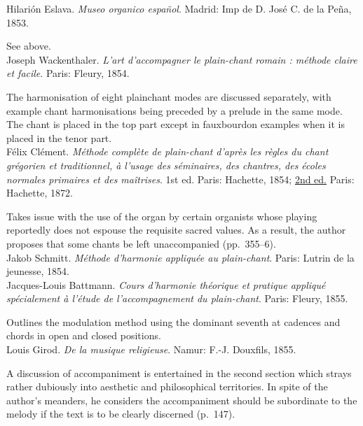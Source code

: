     \parindent=0pt
    \hangindent=0pt
  Hilarión Eslava. \emph{Museo organico español}. Madrid:  Imp de D. José C. de la Peña, 1853.

     \parindent=20pt
     \hangindent=20pt
     See  above.\\

    \parindent=0pt
    \hangindent=0pt
  Joseph Wackenthaler. \emph{L'art d'accompagner le plain-chant romain : méthode claire et facile}. Paris:  Fleury, 1854.

     \parindent=20pt
     \hangindent=20pt
     The harmonisation of eight plainchant modes are discussed separately, with example chant harmonisations being preceded by a prelude in the same mode. The chant is placed in the top part except in fauxbourdon examples when it is placed in the tenor part.\\

    \parindent=0pt
    \hangindent=0pt
  Félix Clément. \emph{Méthode complète de plain-chant d'après les règles du chant grégorien et traditionnel, à l'usage des séminaires, des chantres, des écoles normales primaires et des maîtrises}. 1st ed. Paris:  Hachette, 1854;  \underline{2nd ed.} Paris:  Hachette, 1872.

     \parindent=20pt
     \hangindent=20pt
     Takes issue with the use of the organ by certain organists whose playing reportedly does not espouse the requisite sacred values. As a result, the author proposes that some chants be left unaccompanied (pp.~355--6).\\

    \parindent=0pt
    \hangindent=0pt
  \covid{}Jakob Schmitt. \emph{Méthode d'harmonie appliquée au plain-chant}. Paris:  Lutrin de la jeunesse, 1854. \\

    \parindent=0pt
    \hangindent=0pt
  Jacques-Louis Battmann. \emph{Cours d'harmonie théorique et pratique appliqué spécialement à l'étude de l'accompagnement du plain-chant}. Paris:  Fleury, 1855.

     \parindent=20pt
     \hangindent=20pt
     Outlines the modulation method using the dominant seventh at cadences and chords in open and closed positions.\\

    \parindent=0pt
    \hangindent=0pt
  Louis Girod. \emph{De la musique religieuse}. Namur:  F.-J. Douxfils, 1855.

     \parindent=20pt
     \hangindent=20pt
     A discussion of accompaniment is entertained in the second section which strays rather dubiously into aesthetic and philosophical territories. In spite of the author's meanders, he considers the accompaniment should be subordinate to the melody if the text is to be clearly discerned (p.~147).\\


